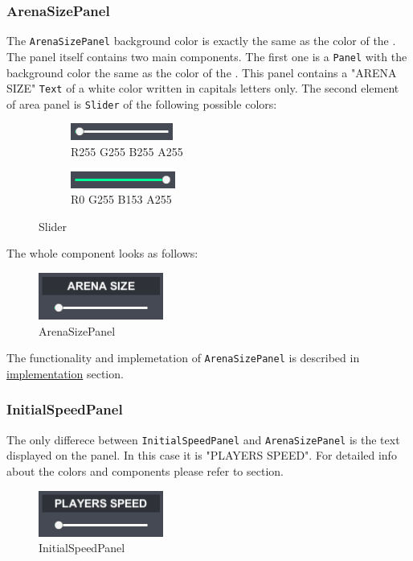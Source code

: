 \subsubsection*{ArenaSizePanel}\label{gui-arenasizepanel}
\indent The \verb+ArenaSizePanel+ background color is exactly the same as the color of the . The panel itself contains two main components. The first one is a \verb+Panel+ with the background color the same as the color of the . This panel contains a "ARENA SIZE" \verb+Text+ of a white color written in capitals letters only. The second element of area panel is \verb+Slider+ of the following possible colors:
\begin{figure}[h] 
\centering
\begin{subfigure}{0.22\textwidth}
\includegraphics[scale=1]{slider0}
\caption*{\hspace*{0.1cm}R255 G255 B255 A255}
\end{subfigure}
\begin{subfigure}{0.22\textwidth}
\includegraphics[scale=1]{slider1}
\caption*{\hspace*{0.1cm}R0 G255 B153 A255}
\end{subfigure}
\caption{Slider}
\end{figure}

\noindent The whole component looks as follows:
\begin{figure}[h] 
\centering
\includegraphics[scale=1]{arenasizepanel}
\caption{ArenaSizePanel}
\end{figure}

\noindent The functionality and implemetation of \verb+ArenaSizePanel+ is described in \hyperref[gui-implementation]{implementation} section.

\subsubsection*{InitialSpeedPanel}\label{gui-initialspeedpanel}
\indent The only differece between \verb+InitialSpeedPanel+ and \verb+ArenaSizePanel+ is the text displayed on the panel. In this case it is "PLAYERS SPEED". For detailed info about the colors and components please refer to  section.
\begin{figure}[h] 
\centering
\includegraphics[scale=1]{initialspeedpanel}
\caption{InitialSpeedPanel}
\end{figure}

